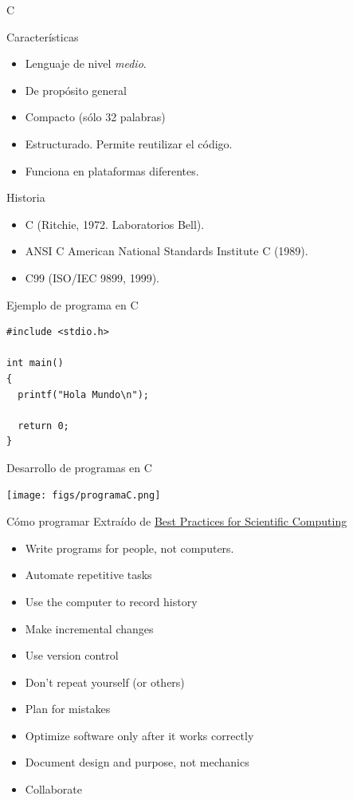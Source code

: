 \documentclass[xcolor={usenames,svgnames,dvipsnames}, aspectratio=169]{beamer}
\begin{document}
\begin{frame}[label={sec:org3aa0442}]{C}
\begin{block}{Características}
\begin{itemize}
\item Lenguaje de nivel \emph{medio}.
\item De propósito general
\item Compacto (sólo 32 palabras)
\item Estructurado. Permite reutilizar el código.
\item Funciona en plataformas diferentes.
\end{itemize}
\end{block}

\begin{block}{Historia}
\begin{itemize}
\item C (Ritchie, 1972. Laboratorios Bell).
\item ANSI C American National Standards Institute C (1989).
\item C99 (ISO/IEC 9899, 1999).
\end{itemize}
\end{block}
\end{frame}
\begin{frame}[label={sec:org1fbeea4},fragile]{Ejemplo de programa en C}
 \lstset{language=C,label= ,caption= ,captionpos=b,numbers=none}
\begin{lstlisting}
#include <stdio.h>

int main()
{
  printf("Hola Mundo\n");

  return 0;
}
\end{lstlisting}
\end{frame}
\begin{frame}[label={sec:org3f88020}]{Desarrollo de programas en C}
\begin{center}
\texttt{[image: figs/programaC.png]}
\end{center}
\end{frame}


\begin{frame}[label={sec:org3418000}]{Cómo programar}
Extraído de \href{https://arxiv.org/pdf/1210.0530v4.pdf}{Best Practices for Scientific Computing}

\begin{itemize}
\item Write programs for people, not computers.
\item Automate repetitive tasks
\item Use the computer to record history
\item Make incremental changes
\item Use version control
\item Don't repeat yourself (or others)
\item Plan for mistakes
\item Optimize software only after it works correctly
\item Document design and purpose, not mechanics
\item Collaborate
\end{itemize}
\end{frame}
\end{document}
